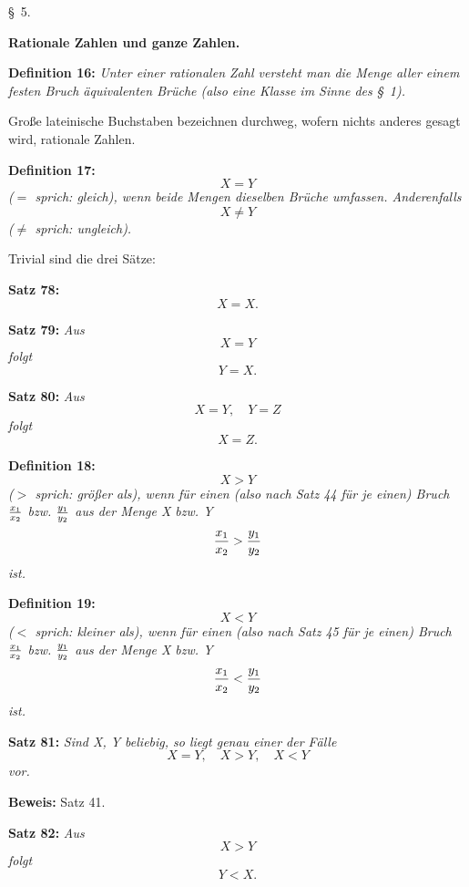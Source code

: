 
\line{}\baselineskip
\centerline{{\S}~5.}
\medskip

\centerline{\bf Rationale Zahlen und ganze Zahlen.}
\bigskip

{\bf Definition 16:} {\it Unter einer rationalen Zahl versteht man die
Menge aller einem festen Bruch \"aquiva\-lenten Br\"uche {\rm (also eine Klasse
im Sinne des {\S}~1).}}

Gro{\ss}e lateinische Buchstaben bezeichnen durchweg, wofern
nichts anderes gesagt wird, rationale Zahlen.
\medskip


{\bf Definition 17:} {\it $$X = Y$$
{\rm ($=$ sprich: gleich),} wenn beide Mengen dieselben Br\"uche umfassen.
Anderenfalls
$$X \ne Y$$
{\rm ($\ne$ sprich: ungleich).}}

Trivial sind die drei S\"atze:
\medskip


{\bf Satz 78:} {\it $$X = X.$$}%
\medskip


{\bf Satz 79:} {\it Aus
$$X = Y$$
folgt
$$Y = X.$$}%
\medskip


{\bf Satz 80:} {\it Aus
$$X = Y,\quad Y = Z$$
folgt
$$X = Z.$$}%
\medskip


{\bf Definition 18:} {\it $$X > Y$$
{\rm ($>$ sprich: gr\"o{\ss}er als),} wenn f\"ur einen {\rm (also nach Satz 44 f\"ur je
einen)} Bruch $x_1 \over x_2$ bzw. $y_1 \over y_2$ aus der Menge X bzw. Y
$${x_1 \over x_2} > {y_1 \over y_2}$$
ist.}
\medskip


{\bf Definition 19:} {\it $$X < Y$$
{\rm ($<$ sprich: kleiner als),} wenn f\"ur einen {\rm (also nach Satz 45 f\"ur je
einen)} Bruch $x_1 \over x_2$ bzw. $y_1 \over y_2$ aus der Menge X bzw. Y
$${x_1 \over x_2} < {y_1 \over y_2}$$
ist.}
\medskip


{\bf Satz 81:} {\it Sind X, Y beliebig, so liegt genau einer der F\"alle
$$X = Y,\quad X > Y,\quad X < Y$$
vor.}

{\bf Beweis:} Satz 41.
\medskip


{\bf Satz 82:} {\it Aus
$$X > Y$$
folgt
$$Y < X.$$}%


